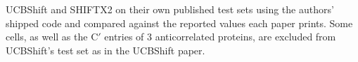 UCBShift and SHIFTX2 on their own published test sets using the authors' shipped code and compared against the reported values each paper prints. Some cells, as well as the C$'$ entries of 3 anticorrelated proteins, are excluded from UCBShift's test set as in the UCBShift paper\cite{UCBShift}.
